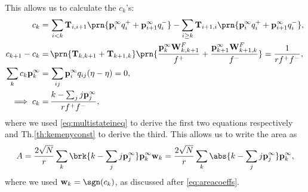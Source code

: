 \documentclass[12pt]{article}
\newcommand{\eq}{\mathbf{p}^\infty}
\newcommand{\fpt}{\mathbf{T}}
\newcommand{\w}{\mathbf{w}}
\newcommand{\W}{\mathbf{W}}
\begin{document}
This allows us to calculate the $c_k$'s:
%
\begin{equation}\label{eq:areacoeffchain}
\begin{aligned}
  c_k =&\, \sum_{i<k} \fpt_{i,i+1} \prn{\eq_{i}q^+_i+\eq_{i+1}q^-_i}
    - \sum_{i\geq k} \fpt_{i+1,i} \prn{\eq_{i}q^+_i+\eq_{i+1}q^-_i}
  ,\\
  c_{k+1} - c_k =&\, \prn{\fpt_{k,k+1}+\fpt_{k+1,k}} \prn{\frac{\eq_{k}\W^F_{k,k+1}}{f^+}+\frac{\eq_{k+1}\W^F_{k+1,k}}{f^-}}
    =%
    \frac{1}{rf^+f^-},\\
  \sum_k c_k \eq_k =&\, \sum_{ij} \eq_i q_{ij} (\eta-\eta) = 0,\\
  \implies c_k =&\, \frac{k - \sum_j j\eq_j}{rf^+f^-},
\end{aligned}
\end{equation}
%
where we used \eqref{eq:multistateineq} to derive the first two equations respectively and Th.\ref{th:kemenyconst} to derive the third. This allows us to write the area as
%
\begin{equation}\label{eq:multistatearea}
  A = \frac{2\sqrt{N}}{r} \sum_k \brk{k - \sum_j j\eq_j} \eq_k \w_k
    = \frac{2\sqrt{N}}{r} \sum_k \abs{k - \sum_j j\eq_j} \eq_k ,
\end{equation}
%
where we used $\w_k=\sgn(c_k)$, as discussed after \eqref{eq:areacoeffs}.
%
\end{document}

